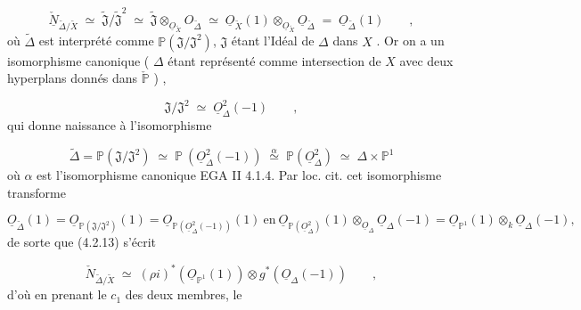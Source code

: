 \begin{equation}\tag{4.2.13}
\underline{\check{N}}_{\widetilde{\Delta}/\widetilde{X}} \;\simeq\; \widetilde{\mathfrak{J}}/\widetilde{\mathfrak{J}}^2 \;\simeq\; \widetilde{\mathfrak{J}} \otimes_{\underline{O}_{\widetilde{X}}} O_{\widetilde{\Delta}} \;\simeq\; \underline{O}_{\widetilde{X}}(1) \otimes_{\underline{O}_{\widetilde{X}}} \underline{O}_{\widetilde{\Delta}} \;=\; \underline{O}_{\widetilde{\Delta}}(1) \qquad ,
\end{equation}
où $\widetilde{\Delta}$ est interprété comme $\mathbb{P}(\mathfrak{J}/\mathfrak{J}^2)$, $\mathfrak{J}$ étant l'Idéal de $\Delta$ dans $X$ . Or on a un isomorphisme canonique ( $\Delta$ étant représenté comme intersection de $X$ avec deux hyperplans  donnés dans $\check{\mathbb{P}}$ ) ,

\begin{equation*}
\mathfrak{J}/\mathfrak{J}^2 \;\simeq\; \underline{O}^2_\Delta(-1) \qquad ,
\end{equation*}
qui donne naissance à l'isomorphisme

\begin{equation*}
\widetilde{\Delta} = \mathbb{P}(\mathfrak{J}/\mathfrak{J}^2) \;\simeq\; \mathbb{P} \ (\underline{O}^2_\Delta(-1)) \;\stackrel{\alpha}{\simeq}\; \mathbb{P}(\underline{O}^2_\Delta) \;\simeq\; \Delta \times \mathbb{P}^1
\end{equation*}
où $\alpha$ est l'isomorphisme canonique EGA II 4.1.4. Par loc. cit. cet isomorphisme transforme

\begin{equation*}
\underline{O}_{\widetilde{\Delta}}(1) = \underline{O}_{\mathbb{P}(\mathfrak{J}/\mathfrak{J}^2)}(1) = \underline{O}_{\mathbb{P}(\underline{O}^2_\Delta(-1))}(1) \ \text{en} \ \underline{O}_{\mathbb{P}(\underline{O}^2_\Delta)}(1) \otimes_{\underline{O}_\Delta} \underline{O}_\Delta(-1) = \underline{O}_{\mathbb{P}^1}(1) \otimes_k \underline{O}_\Delta(-1),
\end{equation*}
de sorte que (4.2.13) s'écrit

\begin{equation}\tag{4.2.14}
\check{N}_{\widetilde{\Delta}/\widetilde{X}} \;\simeq\; (\rho i)^*(\underline{O}_{\mathbb{P}^1}(1)) \otimes g^*(\underline{O}_\Delta(-1)) \qquad ,
\end{equation}
d'où en prenant le $c_1$ des deux membres, le 



